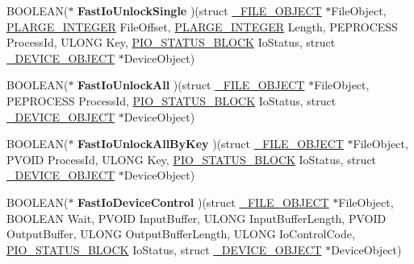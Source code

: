 \begin{DoxyCompactItemize}
\item 
\hypertarget{struct__FAST__IO__DISPATCH_ad0a697531e90c7df410e8aa912afc98b}{}B\+O\+O\+L\+E\+A\+N($\ast$ {\bfseries Fast\+Io\+Unlock\+Single} )(struct \hyperlink{struct__FILE__OBJECT}{\+\_\+\+F\+I\+L\+E\+\_\+\+O\+B\+J\+E\+C\+T} $\ast$File\+Object, \hyperlink{union__LARGE__INTEGER}{P\+L\+A\+R\+G\+E\+\_\+\+I\+N\+T\+E\+G\+E\+R} File\+Offset, \hyperlink{union__LARGE__INTEGER}{P\+L\+A\+R\+G\+E\+\_\+\+I\+N\+T\+E\+G\+E\+R} Length, P\+E\+P\+R\+O\+C\+E\+S\+S Process\+Id, U\+L\+O\+N\+G Key, \hyperlink{struct__IO__STATUS__BLOCK}{P\+I\+O\+\_\+\+S\+T\+A\+T\+U\+S\+\_\+\+B\+L\+O\+C\+K} Io\+Status, struct \hyperlink{struct__DEVICE__OBJECT}{\+\_\+\+D\+E\+V\+I\+C\+E\+\_\+\+O\+B\+J\+E\+C\+T} $\ast$Device\+Object)\label{struct__FAST__IO__DISPATCH_ad0a697531e90c7df410e8aa912afc98b}

\item 
\hypertarget{struct__FAST__IO__DISPATCH_a5bb27eec47852ce50efe3c11fea81cc5}{}B\+O\+O\+L\+E\+A\+N($\ast$ {\bfseries Fast\+Io\+Unlock\+All} )(struct \hyperlink{struct__FILE__OBJECT}{\+\_\+\+F\+I\+L\+E\+\_\+\+O\+B\+J\+E\+C\+T} $\ast$File\+Object, P\+E\+P\+R\+O\+C\+E\+S\+S Process\+Id, \hyperlink{struct__IO__STATUS__BLOCK}{P\+I\+O\+\_\+\+S\+T\+A\+T\+U\+S\+\_\+\+B\+L\+O\+C\+K} Io\+Status, struct \hyperlink{struct__DEVICE__OBJECT}{\+\_\+\+D\+E\+V\+I\+C\+E\+\_\+\+O\+B\+J\+E\+C\+T} $\ast$Device\+Object)\label{struct__FAST__IO__DISPATCH_a5bb27eec47852ce50efe3c11fea81cc5}

\item 
\hypertarget{struct__FAST__IO__DISPATCH_a9acc22e2cc2b729c4cbc1f71a0d27274}{}B\+O\+O\+L\+E\+A\+N($\ast$ {\bfseries Fast\+Io\+Unlock\+All\+By\+Key} )(struct \hyperlink{struct__FILE__OBJECT}{\+\_\+\+F\+I\+L\+E\+\_\+\+O\+B\+J\+E\+C\+T} $\ast$File\+Object, P\+V\+O\+I\+D Process\+Id, U\+L\+O\+N\+G Key, \hyperlink{struct__IO__STATUS__BLOCK}{P\+I\+O\+\_\+\+S\+T\+A\+T\+U\+S\+\_\+\+B\+L\+O\+C\+K} Io\+Status, struct \hyperlink{struct__DEVICE__OBJECT}{\+\_\+\+D\+E\+V\+I\+C\+E\+\_\+\+O\+B\+J\+E\+C\+T} $\ast$Device\+Object)\label{struct__FAST__IO__DISPATCH_a9acc22e2cc2b729c4cbc1f71a0d27274}

\item 
\hypertarget{struct__FAST__IO__DISPATCH_a02fd0bbcc94807e1700e01071f2480b1}{}B\+O\+O\+L\+E\+A\+N($\ast$ {\bfseries Fast\+Io\+Device\+Control} )(struct \hyperlink{struct__FILE__OBJECT}{\+\_\+\+F\+I\+L\+E\+\_\+\+O\+B\+J\+E\+C\+T} $\ast$File\+Object, B\+O\+O\+L\+E\+A\+N Wait, P\+V\+O\+I\+D Input\+Buffer, U\+L\+O\+N\+G Input\+Buffer\+Length, P\+V\+O\+I\+D Output\+Buffer, U\+L\+O\+N\+G Output\+Buffer\+Length, U\+L\+O\+N\+G Io\+Control\+Code, \hyperlink{struct__IO__STATUS__BLOCK}{P\+I\+O\+\_\+\+S\+T\+A\+T\+U\+S\+\_\+\+B\+L\+O\+C\+K} Io\+Status, struct \hyperlink{struct__DEVICE__OBJECT}{\+\_\+\+D\+E\+V\+I\+C\+E\+\_\+\+O\+B\+J\+E\+C\+T} $\ast$Device\+Object)\label{struct__FAST__IO__DISPATCH_a02fd0bbcc94807e1700e01071f2480b1}


\end{DoxyCompactItemize}
